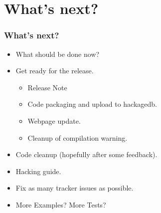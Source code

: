\documentclass{beamer}
\begin{document}
\section{What's next?}

\begin{frame}
  \frametitle{What's next?}
 \begin{itemize}
 \item What should be done now? 
 \item Get ready for the release.
   \begin{itemize}
     \item Release Note
     \item Code packaging and upload to hackagedb.
     \item Webpage update.
     \item Cleanup of compilation warning.
   \end{itemize}
 \item Code cleanup (hopefully after some feedback).
 \item Hacking guide.
 \item Fix as many tracker issues as possible.
 \item More Examples? More Tests?
 \end{itemize}
\end{frame}
\end{document}
